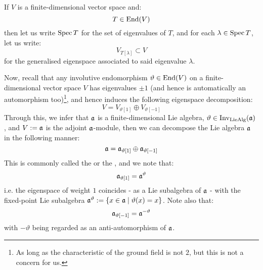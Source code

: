         \begin{convention}
            If $V$ is a finite-dimensional vector space and:
                $$T \in \operatorname{End}(V)$$
            then let us write $\operatorname{Spec} T$ for the set of eigenvalues of $T$, and for each $\lambda \in \operatorname{Spec} T$, let us write:
                $$V_{T[\lambda]} \subset V$$
            for the generalised eigenspace associated to said eigenvalue $\lambda$.
        \end{convention}
        Now, recall that any involutive endomorphism $\vartheta \in \operatorname{End}(V)$ on a finite-dimensional vector space $V$ has eigenvalues $\pm 1$ (and hence is automatically an automorphism too)\footnote{As long as the characteristic of the ground field is not $2$, but this is not a concern for us.}, and hence induces the following eigenspace decomposition:
            $$V = V_{\vartheta[1]} \oplus V_{\vartheta[-1]}$$
        Through this, we infer that $\mathfrak{a}$ is a finite-dimensional Lie algebra, $\vartheta \in \operatorname{Inv}_{\mathrm{Lie}\mathrm{Alg}}(\mathfrak{a})$ , and $V := \mathfrak{a}$ is the adjoint $\mathfrak{a}$-module, then we can decompose the Lie algebra $\mathfrak{a}$ in the following manner:
            \begin{equation} \label{equation: symmetric_space_decomposition}
                \mathfrak{a} = \mathfrak{a}_{\vartheta[1]} \oplus \mathfrak{a}_{\vartheta[-1]}
            \end{equation}
        This is commonly called the  or the , and we note that:
            $$\mathfrak{a}_{\vartheta[1]} = \mathfrak{a}^{\vartheta}$$
        i.e. the eigenspace of weight $1$ coincides - as a Lie subalgebra of $\mathfrak{a}$ - with the fixed-point Lie subalgebra $\mathfrak{a}^{\vartheta} := \{x \in \mathfrak{a} \mid \vartheta(x) = x\}$. Note also that:
            $$\mathfrak{a}_{\vartheta[-1]} = \mathfrak{a}^{-\vartheta}$$
        with $-\vartheta$ being regarded as an anti-automorphism of $\mathfrak{a}$.

